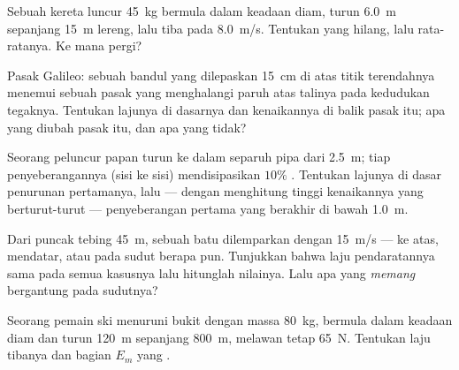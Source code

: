 \begin{exercise}[$\star\star$]\label{exo:g11:mechanical-energy:10}
Sebuah kereta luncur \qty{45}{kg} bermula dalam keadaan diam, turun
\qty{6.0}{m} sepanjang \qty{15}{m} lereng, lalu tiba pada
\qty{8.0}{m/s}. Tentukan  yang hilang, lalu 
rata-ratanya. Ke mana  pergi?
\end{exercise}

\begin{exercise}[$\star\star$]\label{exo:g11:mechanical-energy:11}
Pasak Galileo: sebuah bandul yang dilepaskan \qty{15}{cm} di atas titik
terendahnya menemui sebuah pasak yang menghalangi paruh atas talinya
pada kedudukan tegaknya. Tentukan lajunya di dasarnya dan kenaikannya
di balik pasak itu; apa yang diubah pasak itu, dan apa yang tidak?
\end{exercise}

\begin{exercise}[$\star\star\star$]\label{exo:g11:mechanical-energy:12}
Seorang peluncur papan turun ke dalam separuh pipa dari \qty{2.5}{m};
tiap penyeberangannya (sisi ke sisi) mendisipasikan $10\%$ . Tentukan lajunya di dasar penurunan pertamanya, lalu ---
dengan menghitung tinggi kenaikannya yang berturut-turut ---
penyeberangan pertama yang berakhir di bawah \qty{1.0}{m}.
\end{exercise}

\begin{exercise}[$\star\star\star$]\label{exo:g11:mechanical-energy:13}
Dari puncak tebing \qty{45}{m}, sebuah batu dilemparkan dengan
\qty{15}{m/s} --- ke atas, mendatar, atau pada sudut berapa pun.
Tunjukkan bahwa laju pendaratannya sama pada semua kasusnya lalu
hitunglah nilainya. Lalu apa yang \emph{memang} bergantung pada
sudutnya?
\end{exercise}

\begin{exercise}[$\star\star\star$]\label{exo:g11:mechanical-energy:14}
Seorang pemain ski menuruni bukit dengan massa \qty{80}{kg}, bermula
dalam keadaan diam dan turun \qty{120}{m} sepanjang 
\qty{800}{m}, melawan  tetap \qty{65}{N}. Tentukan laju
tibanya dan bagian $E_m$ yang .
\end{exercise}

